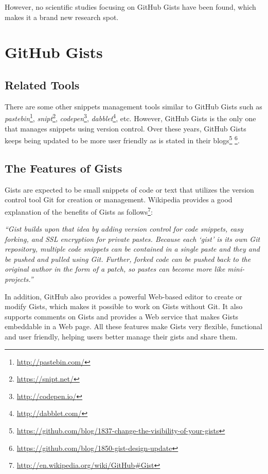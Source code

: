 However, no scientific studies focusing on GitHub Gists have been found, which makes it a brand new research spot.

\section{GitHub Gists}

\subsection{Related Tools}
There are some other snippets management tools similar to GitHub Gists such as \textit{pastebin}\footnote{\url{http://pastebin.com/}}, \textit{snipt}\footnote{\url{https://snipt.net/}}, \textit{codepen}\footnote{\url{http://codepen.io/}}, \textit{dabblet}\footnote{\url{http://dabblet.com/}}, etc. However, GitHub Gists is the only one that manages snippets using version control. Over these years, GitHub Gists keeps being updated to be more user friendly as is stated in their blogs\footnote{\url{https://github.com/blog/1837-change-the-visibility-of-your-gists}} \footnote{\url{https://github.com/blog/1850-gist-design-update}}.

\subsection{The Features of Gists}

Gists are expected to be small snippets of code or text that utilizes the version control tool Git for creation or management. Wikipedia provides a good explanation of the benefits of Gists as follows\footnote{\url{http://en.wikipedia.org/wiki/GitHub\#Gist}}: 

\textsl{``Gist builds upon that idea by adding version control for code snippets, easy forking, and SSL encryption for private pastes. Because each `gist' is its own Git repository, multiple code snippets can be contained in a single paste and they and be pushed and pulled using Git. Further, forked code can be pushed back to the original author in the form of a patch, so pastes can become more like mini-projects.''}

In addition, GitHub also provides a powerful Web-based editor to create or modify Gists, which makes it possible to work on Gists without Git. It also supports comments on Gists and provides a Web service that makes Gists embeddable in a Web page. All these features make Gists very flexible, functional and user friendly, helping users better manage their gists and share them.